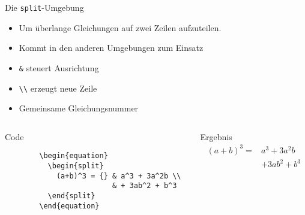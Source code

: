 \begin{frame}[fragile]{Die \texttt{split}-Umgebung}
  \begin{itemize}
    \item Um überlange Gleichungen auf zwei Zeilen aufzuteilen.
    \item Kommt in den anderen Umgebungen zum Einsatz
    \item \texttt{\&} steuert Ausrichtung
    \item \verb+\\+ erzeugt neue Zeile
    \item Gemeinsame Gleichungsnummer
  \end{itemize}
  \begin{columns}[onlytextwidth, t]
    \begin{column}{0.55\textwidth}
      \begin{block}{Code}
        \begin{lstlisting}
        \begin{equation}
          \begin{split}
            (a+b)^3 = {} & a^3 + 3a^2b \\
                         & + 3ab^2 + b^3
          \end{split}
        \end{equation}
        \end{lstlisting}
      \end{block}
    \end{column}
    \begin{column}{0.41\textwidth}
      \begin{block}{Ergebnis}
        \vspace{0.5em}
        \begin{equation}
          \begin{split}
            (a+b)^3 = {} & a^3 + 3a^2b \\
                         & + 3ab^2 + b^3
          \end{split}
        \end{equation}
      \end{block}
    \end{column}
  \end{columns}
\end{frame}
